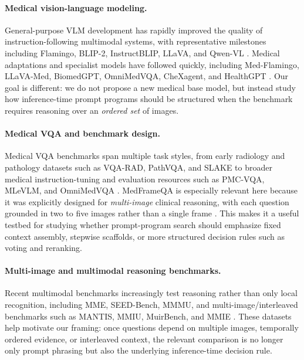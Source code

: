 \documentclass[11pt]{article}
\begin{document}
\paragraph{Medical vision-language modeling.}
General-purpose VLM development has rapidly improved the quality of instruction-following multimodal systems, with representative milestones including Flamingo, BLIP-2, InstructBLIP, LLaVA, and Qwen-VL \citep{alayrac2022flamingo,li2023blip2,dai2023instructblip,liu2023llava,bai2023qwenvl}. Medical adaptations and specialist models have followed quickly, including Med-Flamingo, LLaVA-Med, BiomedGPT, OmniMedVQA, CheXagent, and HealthGPT \citep{moor2023medflamingo,li2023llavamed,zhang2023biomedgpt,hu2024omnimedvqa,chen2024chexagent,lin2025healthgpt}. Our goal is different: we do not propose a new medical base model, but instead study how inference-time prompt programs should be structured when the benchmark requires reasoning over an \emph{ordered set} of images.

\paragraph{Medical VQA and benchmark design.}
Medical VQA benchmarks span multiple task styles, from early radiology and pathology datasets such as VQA-RAD, PathVQA, and SLAKE to broader medical instruction-tuning and evaluation resources such as PMC-VQA, MLeVLM, and OmniMedVQA \citep{lau2018vqarad,he2020pathvqa,liu2021slake,zhang2023pmcvqa,xu2024mlevlm,hu2024omnimedvqa}. MedFrameQA is especially relevant here because it was explicitly designed for \emph{multi-image} clinical reasoning, with each question grounded in two to five images rather than a single frame \citep{yu2025medframeqa}. This makes it a useful testbed for studying whether prompt-program search should emphasize fixed context assembly, stepwise scaffolds, or more structured decision rules such as voting and reranking.

\paragraph{Multi-image and multimodal reasoning benchmarks.}
Recent multimodal benchmarks increasingly test reasoning rather than only local recognition, including MME, SEED-Bench, MMMU, and multi-image/interleaved benchmarks such as MANTIS, MMIU, MuirBench, and MMIE \citep{fu2023mme,li2023seedbench,yue2023mmmu,jiang2024mantis,meng2025mmiu,wang2025muirbench,xia2025mmie}. These datasets help motivate our framing: once questions depend on multiple images, temporally ordered evidence, or interleaved context, the relevant comparison is no longer only prompt phrasing but also the underlying inference-time decision rule.
\end{document}
